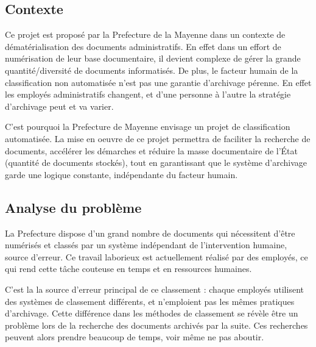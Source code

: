 
\subsection{Contexte}

Ce projet est proposé par la Prefecture de la Mayenne dans un contexte de dématérialisation des documents administratifs.
En effet dans un effort de numérisation de leur base documentaire, il devient complexe de gérer la grande quantité/diversité de documents informatisés. 
De plus, le facteur humain de la classification non automatisée n'est pas une garantie d'archivage pérenne.
En effet les employés administratifs changent, et d'une personne à l'autre la stratégie d'archivage peut et va varier.


C'est pourquoi la Prefecture de Mayenne envisage un projet de classification automatisée.
La mise en oeuvre de ce projet permettra de faciliter la recherche de documents, accélérer les démarches et réduire la masse documentaire de l'État (quantité de documents stockés), tout en garantissant que le système d'archivage garde une logique constante, indépendante du facteur humain.



\subsection{Analyse du problème}



La Prefecture dispose d'un grand nombre de documents qui nécessitent d'être numérisés et classés par un système indépendant de l'intervention humaine, source d'erreur.
Ce travail laborieux est actuellement réalisé par des employés, ce qui rend cette tâche couteuse en temps et en ressources humaines.

C'est la la source d'erreur principal de ce classement : chaque employés utilisent des systèmes de classement différents, et n'emploient pas les mêmes pratiques d'archivage.
Cette différence dans les méthodes de classement se révèle être un problème lors de la recherche des documents archivés par la suite.
Ces recherches peuvent alors prendre beaucoup de temps, voir même ne pas aboutir.

